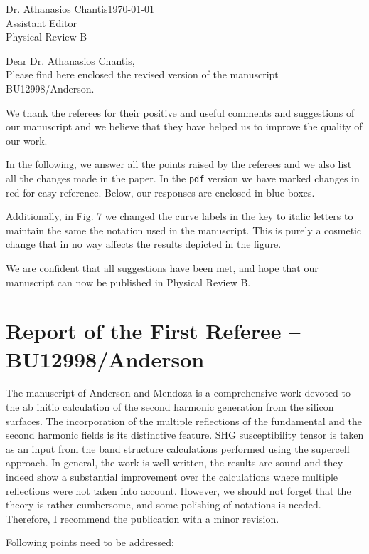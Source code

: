 \documentclass[11pt]{article}
\begin{document}
Dr. Athanasios Chantis\hfill{\today}\\
Assistant Editor\\
Physical Review B

Dear Dr. Athanasios Chantis,\\

Please find here enclosed the revised version of the manuscript
BU12998/Anderson.

We thank the referees for their positive and useful comments and suggestions of
our manuscript and we believe that they have helped us to improve the quality of
our work.

In the following, we answer all the points raised by the referees and we also
list all the changes made in the paper. In the \verb=pdf= version we have marked
changes in red for easy reference. Below, our responses are enclosed in blue
boxes.

Additionally, in Fig. 7 we changed the curve labels in the key to italic letters
to maintain the same the notation used in the manuscript. This is purely a
cosmetic change that in no way affects the results depicted in the figure.

We are confident that all suggestions have been met, and hope that our
manuscript can now be published in Physical Review B.


\section{Report of the First Referee -- BU12998/Anderson}

The manuscript of Anderson and Mendoza is a comprehensive work devoted to the ab
initio calculation of the second harmonic generation from the silicon surfaces.
The incorporation of the multiple reflections of the fundamental and the second
harmonic fields is its distinctive feature. SHG susceptibility tensor is taken
as an input from the band structure calculations performed using the supercell
approach. In general, the work is well written, the results are sound and they
indeed show a substantial improvement over the calculations where multiple
reflections were not taken into account. However, we should not forget that the
theory is rather cumbersome, and some polishing of notations is needed.
Therefore, I recommend the publication with a minor revision.

Following points need to be addressed: 
\end{document}
